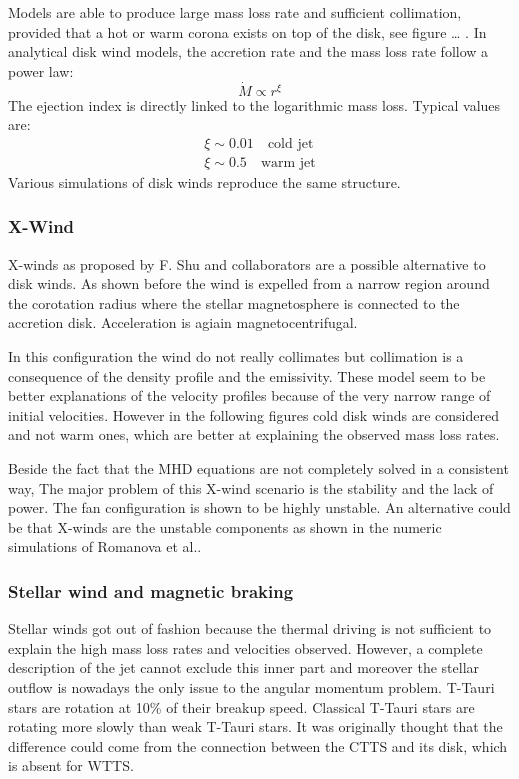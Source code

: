 \documentclass[10pt,a4paper,english,draft]{article}
\begin{document}
Models are able to produce large mass loss rate and sufficient collimation, provided that a hot or warm corona exists on top of the disk, see figure … . In analytical disk wind models, the accretion rate and the mass loss rate follow a power law:
\begin{equation}
  \dot{M} \propto r^\xi
\end{equation}
The ejection index is directly linked to the logarithmic mass loss. Typical values are:
\begin{align}
  \xi \sim 0.01 \quad \textrm{cold jet} \\
  \xi \sim 0.5 \quad \textrm{warm jet}
\end{align}
Various simulations of disk winds reproduce the same structure.
\subsubsection{X-Wind}
X-winds as proposed by F. Shu and collaborators are a possible alternative to disk winds. As shown before the wind is expelled from a narrow region around the corotation radius where the stellar magnetosphere is connected to the accretion disk. Acceleration is agiain magnetocentrifugal.

In this configuration the wind do not really collimates but collimation is a consequence of the density profile and the emissivity.
These model seem to be better explanations of the velocity profiles because of the very narrow range of initial velocities. However in the following figures  cold disk winds are considered and not warm ones, which are better at explaining the observed mass loss rates.

Beside the fact that the MHD equations are not completely solved in a consistent way, The major problem of this X-wind scenario is the stability and the lack of power. The fan  configuration is shown to be highly unstable. An alternative could be that X-winds are the unstable components as shown in the numeric simulations of Romanova et al..
\subsubsection{Stellar wind and magnetic braking}
Stellar winds got out of fashion because the thermal driving is not sufficient to explain the high mass loss rates and velocities observed. However, a complete description of the jet cannot exclude this inner part and moreover the stellar outflow is nowadays the only issue to the angular momentum problem.
T-Tauri stars are rotation at 10\% of their breakup speed. Classical T-Tauri stars are rotating more slowly than weak T-Tauri stars. It was originally thought that the difference could come from the connection between the CTTS and its disk, which is absent for WTTS.
\end{document}
